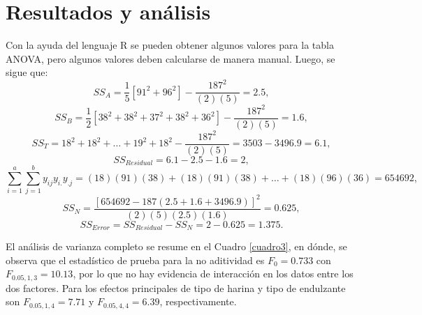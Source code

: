 \documentclass[spanish,letterpaper,12pt]{article}
\begin{document}
\section{Resultados y análisis}
\label{sec:metodo}

Con la ayuda del lenguaje R \nocite{LenguajeR} se pueden obtener algunos valores para la tabla ANOVA, pero algunos valores deben calcularse de manera manual. Luego, se sigue que:
\begin{equation*}
  SS_A = \frac{1}{5} \left[91^2 + 96^2\right] - \frac{187^2}{(2)(5)} = 2.5,
\end{equation*}
\begin{equation*}
  SS_B = \frac{1}{2} \left[38^2 + 38^2 + 37^2 + 38^2 + 36^2\right] - \frac{187^2}{(2)(5)} = 1.6,
\end{equation*}
\begin{equation*}
  SS_T = 18^2 + 18^2 + \ldots + 19^2 + 18^2 - \frac{187^2}{(2)(5)} = 3503 - 3496.9 = 6.1,
\end{equation*}
\begin{equation*}
  SS_{Residual} = 6.1 - 2.5 - 1.6 = 2,
\end{equation*}
\begin{equation*}
  \sum_{i=1}^{a} \sum_{j=1}^{b} y_{ij} y_{i.} y_{.j} = (18)(91)(38) + (18)(91)(38) + \ldots + (18)(96)(36) = 654692,
\end{equation*}
\begin{equation*}
  SS_N = \frac{[654692 - 187(2.5 + 1.6 + 3496.9)]^2}{(2)(5)(2.5)(1.6)} = 0.625,
\end{equation*}
\begin{equation*}
  SS_{Error} = SS_{Residual} - SS_N = 2 - 0.625 = 1.375.
\end{equation*}

El análisis de varianza completo se resume en el Cuadro \ref{cuadro3}, en dónde, se observa que el estadístico de prueba para la no aditividad es $F_0 = 0.733$ con $F_{0.05,1,3} = 10.13$, por lo que no hay evidencia de interacción en los datos entre los dos factores. Para los efectos principales de tipo de harina y tipo de endulzante son $F_{0.05,1,4} = 7.71$ y $F_{0.05,4,4} = 6.39$, respectivamente.
\end{document}
